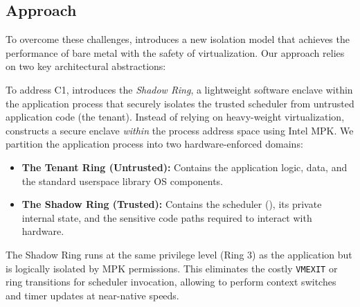 \subsection{ Approach}
To overcome these challenges,  introduces a new isolation model that achieves the performance of bare metal with the safety of virtualization.
Our approach relies on two key architectural abstractions:

To address C1,  introduces the \emph{Shadow Ring}, a lightweight software enclave within the application process that securely isolates the trusted scheduler from untrusted application code (the tenant).
Instead of relying on heavy-weight virtualization,  constructs a secure enclave \textit{within} the process address space using Intel MPK.
We partition the application process into two hardware-enforced domains:
\begin{itemize}
\item \textbf{The Tenant Ring (Untrusted):} Contains the application logic, data, and the standard userspace library OS components.
\item \textbf{The Shadow Ring (Trusted):} Contains the  scheduler (\schedcore), its private internal state, and the sensitive code paths required to interact with hardware.
\end{itemize}
The Shadow Ring runs at the same privilege level (Ring 3) as the application but is logically isolated by MPK permissions.
This eliminates the costly \texttt{VMEXIT} or ring transitions for scheduler invocation, allowing  to perform context switches and timer updates at near-native speeds.

